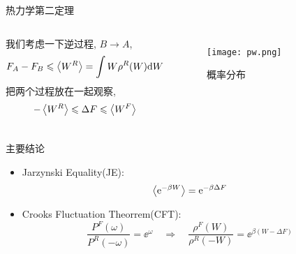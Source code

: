     \begin{frame}{热力学第二定理}
        \begin{columns}
            我们考虑一下逆过程, $B\to A$,
            \begin{equation}
                F_A - F_B \leqslant \expval{W^R} = \int W\rho^R(W)\dd W
            \end{equation}
            把两个过程放在一起观察,
            \begin{equation}
                - \expval{W^R} \leqslant \Delta F \leqslant \expval{W^F}
            \end{equation}
            \pause
            \begin{figure}
                \centering
                \texttt{[image: pw.png]}
                \caption{概率分布}
            \end{figure}
        \end{columns}
    \end{frame}
    \begin{frame}{主要结论}
        \begin{itemize}
            \item Jarzynski Equality(JE):
            \begin{equation}
                \expval{\mathrm{e}^{-\beta W}} = \mathrm{e}^{-\beta \Delta F}
            \end{equation}
            \item Crooks Fluctuation Theorrem(CFT):
            \begin{equation}
                \frac{P^F(\omega)}{P^R(-\omega)} = \ee^{\omega}\quad\Rightarrow\quad \frac{\rho^F(W)}{\rho^R(-W)} = \ee^{\beta(W - \Delta F)}
            \end{equation}
        \end{itemize}
    \end{frame}
